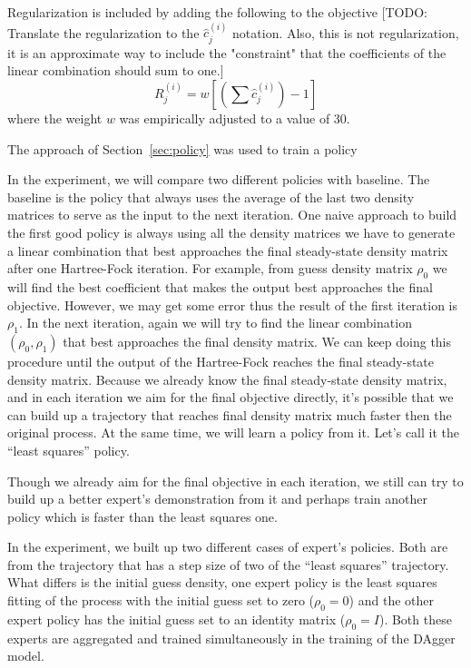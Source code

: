 \documentclass[twoside,11pt]{article}
\begin{document}
Regularization is included by adding the following to the objective [TODO: Translate the regularization to the $\hat{c}^{(i)}_j$ notation. Also, this is not regularization, it is an approximate way to include the "constraint" that the coefficients of the linear combination should sum to one.]
\[
R^{(i)}_j =  w [(\sum \hat{c}^{(i)}_j) - 1]
\]
where the weight $w$ was empirically adjusted to a value of 30. 

The approach of Section~\ref{sec:policy} was used to train a policy 


In the experiment, we will compare two different policies with baseline. The baseline is the policy that always uses the average of the last two density matrices to serve as the input to the next iteration.
One naive approach to build the first good policy is always using all the density matrices we have to generate a linear combination that best approaches the final steady-state density matrix after one Hartree-Fock iteration.  For example, from guess density matrix $\rho_0$ we will find the best coefficient that makes the output best approaches the final objective. However, we may get some error thus the result of the first iteration is $\rho_1$.  In the next iteration, again we will try to find the linear combination $(\rho_0, \rho_1)$ that best approaches the final density matrix. We can keep doing this procedure until the output of the Hartree-Fock reaches the final steady-state density matrix.
Because we already know the final steady-state density matrix, and in each iteration we aim for the final objective directly, it's possible that we can build up a trajectory that reaches final density matrix much faster then the original process. At the same time, we will learn a policy from it. Let's call it the ``least squares'' policy.

Though we already aim for the final objective in each iteration, we still can try to build up a better expert's demonstration from it and perhaps train another policy which is faster than the least squares one.

In the experiment, we built up two different cases of expert's policies. Both are from the trajectory that has a step size of two of the ``least squares'' trajectory. What differs is the initial guess density, one expert policy is the least squares fitting of the process with the initial guess set to zero ($\rho_0 = 0$) and the other expert policy has the initial guess set to an identity matrix ($\rho_0 = I$). Both these experts are aggregated and trained simultaneously in the training of the DAgger model. 
\end{document}
